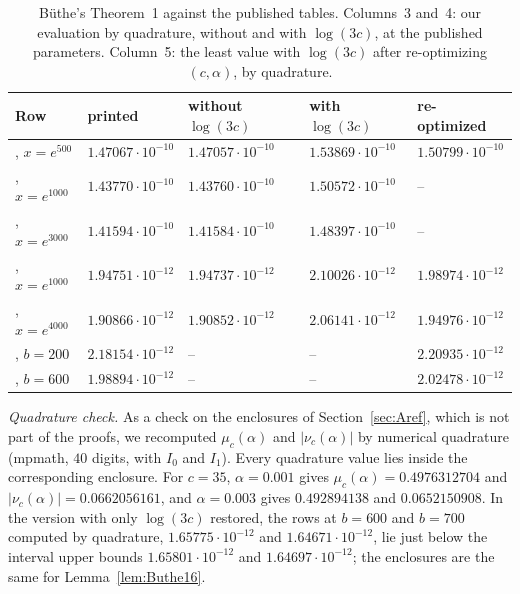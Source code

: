 \documentclass{amsart}
\theoremstyle{definition}
\theoremstyle{remark}
\theoremstyle{plain}
\numberwithin{equation}{section}
\begin{document}
\begin{table}[ht]
\caption{B\"uthe's Theorem~1 against the published tables. Columns~3 and~4: our evaluation by quadrature, without and with $\log(3c)$, at the published parameters. Column~5: the least value with $\log(3c)$ after re-optimizing $(c,\alpha)$, by quadrature.}\label{tab:repro}
\small
\setlength{\tabcolsep}{4pt}
\begin{tabular}{lllll}
\toprule
Row & printed & without $\log(3c)$ & with $\log(3c)$ & re-optimized\\
\midrule
\cite[Table~1]{But16}, $x=e^{500}$   & $1.47067\cdot10^{-10}$ & $1.47057\cdot10^{-10}$ & $1.53869\cdot10^{-10}$ & $1.50799\cdot10^{-10}$\\
\cite[Table~1]{But16}, $x=e^{1000}$  & $1.43770\cdot10^{-10}$ & $1.43760\cdot10^{-10}$ & $1.50572\cdot10^{-10}$ & --\\
\cite[Table~1]{But16}, $x=e^{3000}$  & $1.41594\cdot10^{-10}$ & $1.41584\cdot10^{-10}$ & $1.48397\cdot10^{-10}$ & --\\
\cite[Table~2]{But16}, $x=e^{1000}$  & $1.94751\cdot10^{-12}$ & $1.94737\cdot10^{-12}$ & $2.10026\cdot10^{-12}$ & $1.98974\cdot10^{-12}$\\
\cite[Table~2]{But16}, $x=e^{4000}$  & $1.90866\cdot10^{-12}$ & $1.90852\cdot10^{-12}$ & $2.06141\cdot10^{-12}$ & $1.94976\cdot10^{-12}$\\
\cite[Table~8]{BKLNW21}, $b=200$     & $2.18154\cdot10^{-12}$ & -- & -- & $2.20935\cdot10^{-12}$\\
\cite[Table~8]{BKLNW21}, $b=600$     & $1.98894\cdot10^{-12}$ & -- & -- & $2.02478\cdot10^{-12}$\\
\bottomrule
\end{tabular}
\end{table}

\emph{Quadrature check.} As a check on the enclosures of Section~\ref{sec:Aref}, which is not part of the proofs, we recomputed $\mu_c(\alpha)$ and $|\nu_c(\alpha)|$ by numerical quadrature (mpmath, $40$ digits, with $I_0$ and $I_1$). Every quadrature value lies inside the corresponding enclosure. For $c=35$, $\alpha=0.001$ gives $\mu_c(\alpha)=0.4976312704$ and $|\nu_c(\alpha)|=0.0662056161$, and $\alpha=0.003$ gives $0.492894138$ and $0.0652150908$. In the version with only $\log(3c)$ restored, the rows at $b=600$ and $b=700$ computed by quadrature, $1.65775\cdot10^{-12}$ and $1.64671\cdot10^{-12}$, lie just below the interval upper bounds $1.65801\cdot10^{-12}$ and $1.64697\cdot10^{-12}$; the enclosures are the same for Lemma~\ref{lem:Buthe16}.
\end{document}
